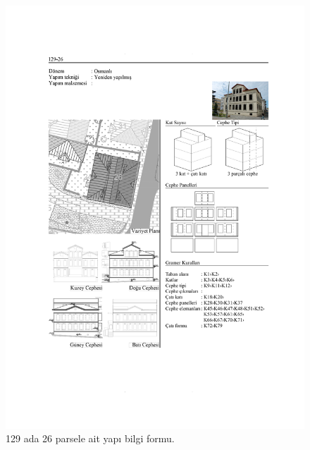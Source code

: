 \begin{figure}
\centering
\includegraphics[width=1\textwidth,height=\textheight]{source/figures/BilgiFormlari/129-26.pdf}
\caption{129 ada 26 parsele ait yapı bilgi formu.}
\end{figure}

